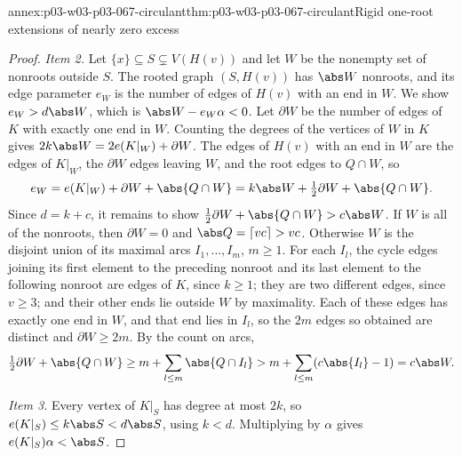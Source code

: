 \begin{annexitem}{annex:p03-w03-p03-067-circulant}{thm:p03-w03-p03-067-circulant}{Rigid one-root extensions of nearly zero excess}
\begin{proof}
\emph{Item 2.}  Let \(\{x\}\subseteq S\subsetneq V(H(v))\) and let \(W\) be
the nonempty set of nonroots outside \(S\).  The rooted graph \((S,H(v))\)
has \(\abs W\) nonroots, and its edge parameter \(e_W\) is the number of
edges of \(H(v)\) with an end in \(W\).  We show \(e_W>d\abs W\), which is
\(\abs W-e_W\alpha<0\).  Let \(\partial W\) be the number of edges of \(K\)
with exactly one end in \(W\).  Counting the degrees of the vertices of
\(W\) in \(K\) gives \(2k\abs W=2e(K|_W)+\partial W\).  The edges of
\(H(v)\) with an end in \(W\) are the edges of \(K|_W\), the \(\partial W\)
edges leaving \(W\), and the root edges to \(Q\cap W\), so
\[
 e_W=e(K|_W)+\partial W+\abs{Q\cap W}=k\abs W+\tfrac12\partial
 W+\abs{Q\cap W}.
\]
Since \(d=k+c\), it remains to show
\(\tfrac12\partial W+\abs{Q\cap W}>c\abs W\).  If \(W\) is all of the
nonroots, then \(\partial W=0\) and \(\abs Q=\lceil vc\rceil>vc\).
Otherwise \(W\) is the disjoint union of its maximal arcs
\(I_1,\ldots,I_m\), \(m\geq1\).  For each \(I_l\), the cycle edges joining
its first element to the preceding nonroot and its last element to the
following nonroot are edges of \(K\), since \(k\geq1\); they are two
different edges, since \(v\geq3\); and their other ends lie outside \(W\)
by maximality.  Each of these edges has exactly one end in \(W\), and that end
lies in \(I_l\), so the \(2m\) edges so obtained are distinct and
\(\partial W\geq2m\).  By the count on arcs,
\[
 \tfrac12\partial W+\abs{Q\cap W}\geq
 m+\sum_{l\leq m}\abs{Q\cap I_l}>m+\sum_{l\leq m}(c\abs{I_l}-1)=c\abs W.
\]

\emph{Item 3.}  Every vertex of \(K|_S\) has degree at most \(2k\), so
\(e(K|_S)\leq k\abs S<d\abs S\), using \(k<d\).  Multiplying by \(\alpha\)
gives \(e(K|_S)\alpha<\abs S\).


\end{proof}
\end{annexitem}

